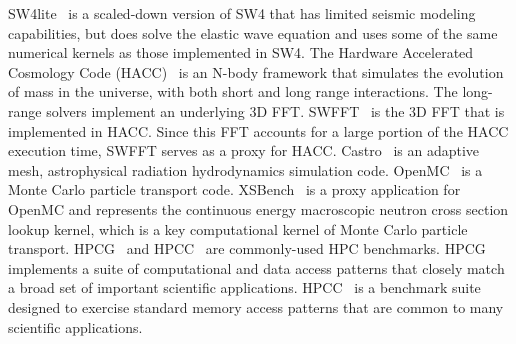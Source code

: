 SW4lite~\cite{ECPProxySuite1} is a scaled-down version of SW4 that has limited seismic modeling capabilities, but does solve the elastic wave equation and uses some of the same numerical kernels as those implemented in SW4.  %
%
The Hardware Accelerated Cosmology Code (HACC)~\cite{HACC} is an 
N-body framework that simulates the evolution of mass in the universe, 
with both short and long range interactions.
The long-range solvers implement an underlying 3D FFT.
SWFFT~\cite{ECPProxySuite1} is the 3D FFT that is %
implemented in HACC.  Since this FFT accounts for a large portion 
of the HACC execution time, SWFFT serves as a proxy for HACC.  
%
Castro~\cite{Castro} is an adaptive mesh, astrophysical radiation
hydrodynamics simulation code.  %
%
OpenMC~\cite{OpenMC} is a Monte Carlo particle transport code.  
XSBench~\cite{XSBench} is a proxy application for OpenMC and represents the
continuous energy macroscopic neutron cross section lookup kernel, which is
a key computational kernel of Monte Carlo particle transport. 
HPCG~\cite{hpcg} and HPCC~\cite{hpcc} are commonly-used HPC
benchmarks.  HPCG implements a suite of computational and data access 
patterns that closely match a broad set of important scientific
applications. HPCC~\cite{hpcc} is a benchmark suite designed
to exercise standard memory access patterns that are common
to many scientific applications. 

